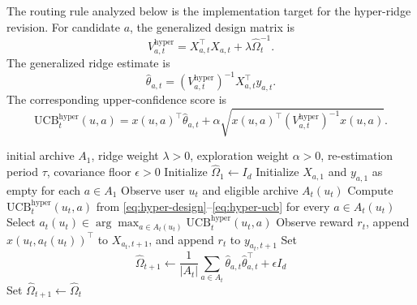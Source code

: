 \documentclass{article} %
\begin{document}
The routing rule analyzed below is the implementation target for the hyper-ridge revision. For candidate \(a\), the generalized design matrix is
\begin{equation}
\label{eq:hyper-design}
V_{a,t}^{\mathrm{hyper}}
=
X_{a,t}^{\top}X_{a,t}
+
\lambda \widehat{\Omega}_t^{-1}.
\end{equation}
The generalized ridge estimate is
\begin{equation}
\label{eq:hyper-theta-hat}
\widehat{\theta}_{a,t}
=
\left(V_{a,t}^{\mathrm{hyper}}\right)^{-1}
X_{a,t}^{\top}y_{a,t}.
\end{equation}
The corresponding upper-confidence score is
\begin{equation}
\label{eq:hyper-ucb}
\mathrm{UCB}_{t}^{\mathrm{hyper}}(u,a)
=
x(u,a)^{\top}\widehat{\theta}_{a,t}
+
\alpha
\sqrt{
x(u,a)^{\top}
\left(V_{a,t}^{\mathrm{hyper}}\right)^{-1}
x(u,a)
}.
\end{equation}

\begin{algorithm}[t]
\caption{Hyper-Ridge PersonalEvo routing}
\label{alg:hyper-ridge-summary}
\begin{algorithmic}[1]
\Require initial archive \(A_1\), ridge weight \(\lambda>0\), exploration weight \(\alpha>0\), re-estimation period \(\tau\), covariance floor \(\epsilon>0\)
\State Initialize \(\widehat{\Omega}_1 \gets I_d\)
\State Initialize \(X_{a,1}\) and \(y_{a,1}\) as empty for each \(a\in A_1\)
    \State Observe user \(u_t\) and eligible archive \(A_t(u_t)\)
    \State Compute \(\mathrm{UCB}_{t}^{\mathrm{hyper}}(u_t,a)\) from \eqref{eq:hyper-design}--\eqref{eq:hyper-ucb} for every \(a\in A_t(u_t)\)
    \State Select \(a_t(u_t)\in \arg\max_{a\in A_t(u_t)}\mathrm{UCB}_{t}^{\mathrm{hyper}}(u_t,a)\)
    \State Observe reward \(r_t\), append \(x(u_t,a_t(u_t))^\top\) to \(X_{a_t,t+1}\), and append \(r_t\) to \(y_{a_t,t+1}\)
        \State Set
        \[
        \widehat{\Omega}_{t+1}
        \gets
        \frac{1}{|A_t|}
        \sum_{a\in A_t}
        \widehat{\theta}_{a,t}\widehat{\theta}_{a,t}^{\top}
        +
        \epsilon I_d
        \]
    \Else
        \State Set \(\widehat{\Omega}_{t+1}\gets \widehat{\Omega}_t\)
    \EndIf
\EndFor
\end{algorithmic}
\end{algorithm}
\end{document}
